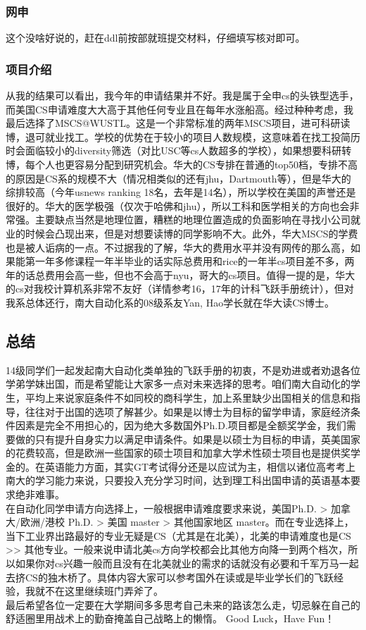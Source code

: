 \documentclass[a4paper,UTF8]{book}
\begin{document}
        \subsubsection*{网申}
        这个没啥好说的，赶在ddl前按部就班提交材料，仔细填写核对即可。

        \subsubsection*{项目介绍}
        从我的结果可以看出，我今年的申请结果并不好。我是属于全申cs的头铁型选手，而美国CS申请难度大大高于其他任何专业且在每年水涨船高。经过种种考虑，我最后选择了MSCS@WUSTL。这是一个非常标准的两年MSCS项目，进可科研读博，退可就业找工。学校的优势在于较小的项目人数规模，这意味着在找工投简历时会面临较小的diversity筛选（对比USC等cs人数超多的学校），如果想要科研转博，每个人也更容易分配到研究机会。华大的CS专排在普通的top50档，专排不高的原因是CS系的规模不大（情况相类似的还有jhu，Dartmouth等），但是华大的综排较高（今年usnews ranking 18名，去年是14名），所以学校在美国的声誉还是很好的。华大的医学极强（仅次于哈佛和jhu），所以工科和医学相关的方向也会非常强。主要缺点当然是地理位置，糟糕的地理位置造成的负面影响在寻找小公司就业的时候会凸现出来，但是对想要读博的同学影响不大。此外，华大MSCS的学费也是被人诟病的一点。不过据我的了解，华大的费用水平并没有网传的那么高，如果能第一年多修课程一年半毕业的话实际总费用和rice的一年半cs项目差不多，两年的话总费用会高一些，但也不会高于nyu，哥大的cs项目。值得一提的是，华大的cs对我校计算机系非常不友好（详情参考16，17年的计科飞跃手册统计），但对我系总体还行，南大自动化系的08级系友Yan, Hao学长就在华大读CS博士。

    \subsection*{总结}
    14级同学们一起发起南大自动化类单独的飞跃手册的初衷，不是劝进或者劝退各位学弟学妹出国，而是希望能让大家多一点对未来选择的思考。咱们南大自动化的学生，平均上来说家庭条件不如同校的商科学生，加上系里缺少出国相关的信息和指导，往往对于出国的选项了解甚少。如果是以博士为目标的留学申请，家庭经济条件因素是完全不用担心的，因为绝大多数国外Ph.D.项目都是全额奖学金，我们需要做的只有提升自身实力以满足申请条件。如果是以硕士为目标的申请，英美国家的花费较高，但是欧洲一些国家的硕士项目和加拿大学术性硕士项目也是提供奖学金的。在英语能力方面，其实GT考试得分还是以应试为主，相信以诸位高考考上南大的学习能力来说，只要投入充分学习时间，达到理工科出国申请的英语基本要求绝非难事。\\
    在自动化同学申请方向选择上，一般根据申请难度要求来说，美国Ph.D. > 加拿大/欧洲/港校 Ph.D. > 美国 master > 其他国家地区 master。而在专业选择上，当下工业界出路最好的专业无疑是CS（尤其是在北美），北美的申请难度也是CS >> 其他专业。一般来说申请北美cs方向学校都会比其他方向降一到两个档次，所以如果你对cs兴趣一般而且没有在北美就业的需求的话就没有必要和千军万马一起去挤CS的独木桥了。具体内容大家可以参考国外在读或是毕业学长们的飞跃经验，我就不在这里继续班门弄斧了。\\
    最后希望各位一定要在大学期间多多思考自己未来的路该怎么走，切忌躲在自己的舒适圈里用战术上的勤奋掩盖自己战略上的懒惰。
    Good Luck，Have Fun！
    
\end{document}
